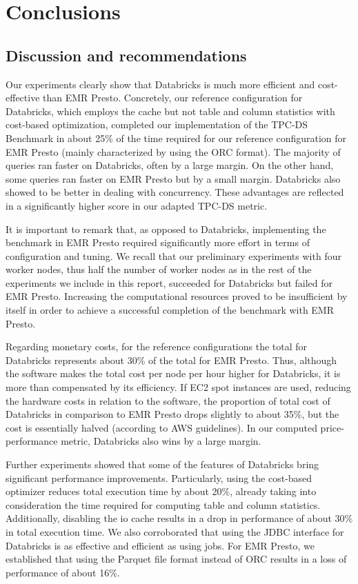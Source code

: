 \section{Conclusions}\label{conclusions}

\subsection{Discussion and recommendations}

Our experiments clearly show that Databricks is much more efficient and cost-effective than EMR Presto. Concretely, our reference configuration for Databricks, which employs the cache but not table and column statistics with cost-based optimization, completed our implementation of the TPC-DS Benchmark in about 25\% of the time required for our reference configuration for EMR Presto (mainly characterized by using the ORC format). The majority of queries ran faster on Databricks, often by a large margin. On the other hand, some queries ran faster on EMR Presto but by a small margin. Databricks also showed to be better in dealing with concurrency. These advantages are reflected in a significantly higher score in our adapted TPC-DS metric.

It is important to remark that, as opposed to Databricks, implementing the benchmark in EMR Presto required significantly more effort in terms of configuration and tuning. We recall that our preliminary experiments with four worker nodes, thus half the number of worker nodes as in the rest of the experiments we include in this report, succeeded for Databricks but failed for EMR Presto. Increasing the computational resources proved to be insufficient by itself in order to achieve a successful completion of the benchmark with EMR Presto.

Regarding monetary costs, for the reference configurations the total for Databricks represents about 30\% of the total for EMR Presto. Thus, although the software makes the total cost per node per hour higher for Databricks, it is more than compensated by its efficiency. If EC2 spot instances are used, reducing the hardware costs in relation to the software, the proportion of total cost of Databricks in comparison to EMR Presto drops slightly to about 35\%, but the cost is essentially halved (according to AWS guidelines). In our computed price-performance metric, Databricks also wins by a large margin.

Further experiments showed that some of the features of Databricks bring significant performance improvements. Particularly, using the cost-based optimizer reduces total execution time by about 20\%, already taking into consideration the time required for computing table and column statistics. Additionally, disabling the io cache results in a drop in performance of about 30\% in total execution time. We also corroborated that using the JDBC interface for Databricks is as effective and efficient as using jobs. For EMR Presto, we established that using the Parquet file format instead of ORC results in a loss of performance of about 16\%.

